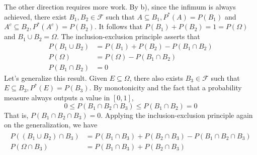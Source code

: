 \documentclass[12pt]{article}
\begin{document}
\begin{problem}[5]
\begin{enumerate}[label=\alph*)]
		The other direction requires more work. By b), since the infimum is always achieved, there exist $B_1,B_2 \in \mathcal{F}$ such that $A \subseteq B_1, P^* (A) = P(B_1)$ and $A^{c} \subseteq B_2, P^* (A^{c}) = P(B_2)$. It follows that $P(B_1) + P(B_2) = 1 = P(\Omega)$ and $B_1 \cup B_2 = \Omega$. The inclusion-exclusion principle asserts that
		\begin{align*}
		    P(B_1 \cup B_2) &= P(B_1) + P(B_2) - P(B_1 \cap B_2)\\
		    P(\Omega) & = P(\Omega) - P(B_1 \cap B_2)\\
		    P(B_1 \cap B_2) &= 0
		\end{align*}
		Let's generalize this result. Given $E \subseteq \Omega$, there also exists $B_3 \in \mathcal{F}$ such that $E \subseteq B_3, P^* (E) = P(B_3)$. By monotonicity and the fact that a probability measure always outputs a value in $[0,1]$, 
		\[
		0\leq P(B_1 \cap B_2 \cap B_3) \leq P(B_1 \cap B_2) = 0
		\]
		That is, $P(B_1 \cap B_2 \cap B_3)=0$. Applying the inclusion-exclusion principle again on the generalization, we have
		\begin{align}
		\begin{split}
		    P((B_1 \cup B_2) \cap B_3) &= P(B_1 \cap B_3) + P(B_2 \cap B_3) - P(B_1 \cap B_2 \cap B_3)\\
		   P(\Omega \cap B_3) &= P(B_1 \cap B_3) + P(B_2 \cap B_3)
		\end{split}
		\end{align}
		

\end{enumerate}
\end{problem}
\end{document}
